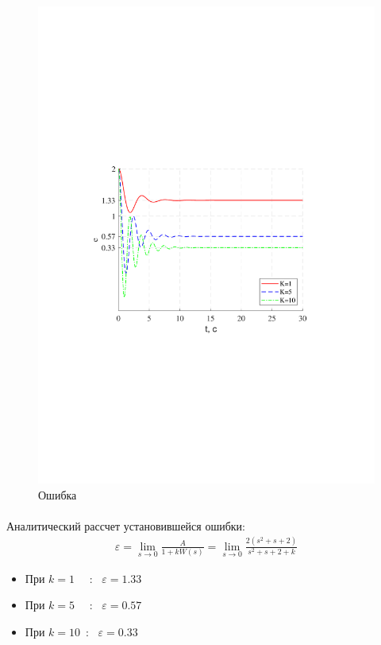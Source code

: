 \documentclass[a4paper,12pt]{article}
\begin{document}
	\begin{figure}[h!]
		\begin{center}
		\renewcommand{\figurename}{Рисунок}
		\includegraphics[width=5in]{err1MOD.pdf}
		\caption{Ошибка}
		\label{s_3}
	\end{center}
	\end{figure}
	
	\newpage
	\paragraph {} Аналитический рассчет установившейся ошибки:\\
	\begin{gather}
	\varepsilon=\lim\limits_{s\rightarrow 0}\frac{A}{1+kW(s)}=\lim\limits_{s\rightarrow 0}\frac{2(s^2+s+2)}{s^2+s+2+k}
	\end{gather}
	\begin{itemize}
		\item При $k=1$ ~~:~ $\varepsilon=1.33$
		\item При $k=5$ ~~:~ $\varepsilon=0.57$
		\item При $k=10$~:~ $\varepsilon=0.33$
	\end{itemize}
\end{document}
